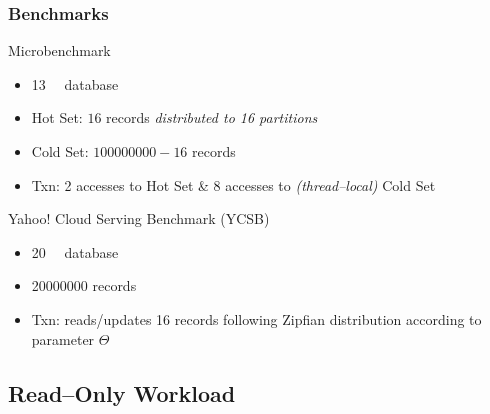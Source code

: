 \begin{frame}
	\frametitle{Benchmarks}
	
	\begin{block}{Microbenchmark}
		\vspace{-.5em}
		\begin{itemize}
			\item	\SI{13}{\giga\byte} database
			\item	Hot Set: $16$ records \emph{distributed to 16 partitions}
			\item	Cold Set: $\num{100000000} - \num{16}$ records
			\item	Txn: 2 accesses to Hot Set \& 8 accesses to \emph{(thread--local)} Cold Set
		\end{itemize}
	\end{block}
	\vspace{-.25em}	
	\begin{block}{Yahoo! Cloud Serving Benchmark (YCSB)}
		\vspace{-.5em}
		\begin{itemize}
			\item	\SI{20}{\giga\byte} database
			\item	\num{20000000} records
			\item	Txn: reads/updates 16 records following Zipfian distribution according to parameter $\Theta$
		\end{itemize}
	\end{block}
\end{frame}

\subsection[Read--Only Workload]{Read--Only Workload} \label{subsec:read}

